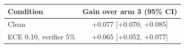 \begin{tabular}{lc}\toprule
Condition & Gain over arm 3 (95\% CI) \\\midrule
Clean & +0.077 [+0.070, +0.085] \\
ECE 0.10, verifier 5\% & +0.065 [+0.052, +0.077] \\
\bottomrule\end{tabular}
